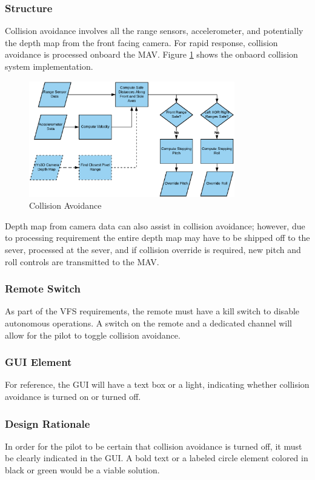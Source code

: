 \documentclass[onecolumn, oneside, letterpaper, draftclsnofoot, 10pt, compsoc]{IEEEtran}
\begin{document}
\subsubsection{Structure}
Collision avoidance involves all the range sensors, accelerometer, and potentially the depth map from the front facing camera. For rapid response, collision avoidance is processed onboard the MAV. Figure \ref{fig:ColAvo} shows the onbaord collision system implementation.
\begin{figure}[h]
    \centering
    \includegraphics[width=0.8\textwidth]{graphics/collision_avoidance.eps}
    \caption{Collision Avoidance}
    \label{fig:ColAvo}
\end{figure}

Depth map from camera data can also assist in collision avoidance; however, due to processing requirement the entire depth map may have to be shipped off to the sever, processed at the sever, and if collision override is required, new pitch and roll controls are transmitted to the MAV.

\subsubsection{Remote Switch}
As part of the VFS requirements, the remote must have a kill switch to disable autonomous operations. A switch on the remote and a dedicated channel will allow for the pilot to toggle collision avoidance.

\subsubsection{GUI Element}
For reference, the GUI will have a text box or a light, indicating whether collision avoidance is turned on or turned off.

\subsubsection{Design Rationale}
In order for the pilot to be certain that collision avoidance is turned off, it must be clearly indicated in the GUI. A bold text or a labeled circle element colored in black or green would be a viable solution.
\end{document}
